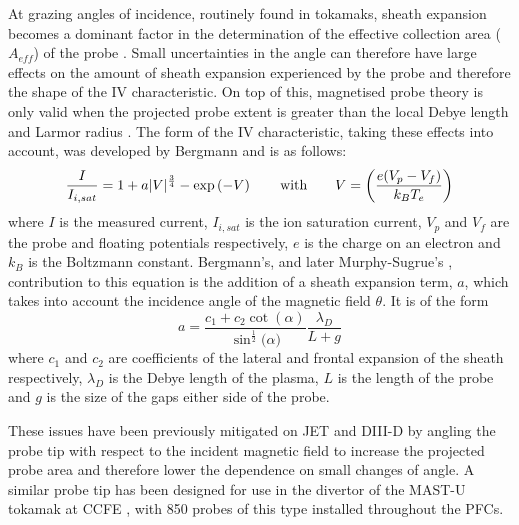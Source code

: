 \documentclass[a4paper, 12pt]{article} %
\begin{document}
	At grazing angles of incidence, routinely found in tokamaks, sheath expansion becomes a dominant factor in the determination of the effective collection area ($A_{eff}$) of the probe \cite{Bergmann1994}. 
	Small uncertainties in the angle can therefore have large effects on the amount of sheath expansion experienced by the probe and therefore the shape of the IV characteristic.
	On top of this, magnetised probe theory is only valid when the projected probe extent is greater than the local Debye length and Larmor radius \cite{Gunn1995}. 
	The form of the IV characteristic, taking these effects into account, was developed by Bergmann \cite{Bergmann2002} and is as follows:
	\begin{equation}
	\label{eq:ivcurvesheathexp}
	\frac{I}{I_{i,sat}} =  1 + a |V|^{\frac{3}{4}} - \exp\left({-V}\right) \qquad \textnormal{with} \qquad  V = \bigg(\frac{e(V_p - V_f)}{k_B T_e}\bigg)
	\end{equation}
	where $I$ is the measured current, $I_{i,sat}$ is the ion saturation current, $V_p$ and $V_f$ are the probe and floating potentials respectively, $e$ is the charge on an electron and $k_B$ is the Boltzmann constant. 
	Bergmann's, and later Murphy-Sugrue's \cite{Murphy-Sugrue2017}, contribution to this equation is the addition of a sheath expansion term, $a$, which takes into account the incidence angle of the magnetic field $\theta$. 
	It is of the form
	\begin{equation}
	\label{eq:sheathexpparam}
	a =  \frac{c_1 + c_2  \cot{(\alpha)}}{\sin^{\frac{1}{2}}{(\alpha})} \frac{\lambda_D}{L + g}
	\end{equation}
	where $c_1$ and $c_2$ are coefficients of the lateral and frontal expansion of the sheath respectively, $\lambda_D$ is the Debye length of the plasma, $L$ is the length of the probe and $g$ is the size of the gaps either side of the probe.
	
	These issues have been previously mitigated on JET\cite{Monk1996} and DIII-D by angling the probe tip with respect to the incident magnetic field to increase the projected probe area and therefore lower the dependence on small changes of angle. 
	A similar probe tip has been designed for use in the divertor of the MAST-U tokamak at CCFE \cite{Harrison}, with 850 probes of this type installed throughout the PFCs.
	
\end{document}
